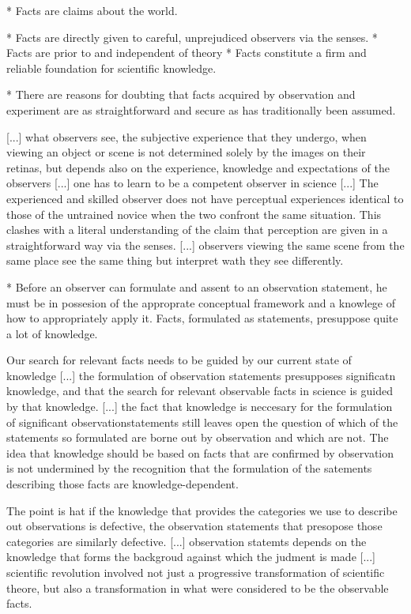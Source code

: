 * Facts are claims about the world.

* Facts are directly given to careful, unprejudiced observers via the senses.
* Facts are prior to and independent of theory
* Facts constitute a firm and reliable foundation for scientific knowledge.

* There are reasons for doubting that facts acquired by observation and experiment are as straightforward and secure as has traditionally been assumed.

{\color{red} [...] what observers see, the subjective experience that they undergo, when viewing an object or scene is not determined solely by the images on their retinas, but depends also on the experience, knowledge and expectations of the observers [...] one has to learn to be a competent observer in science [...] The experienced and skilled observer does not have perceptual experiences identical to those of the untrained novice when the two confront the same situation. This clashes with a literal understanding of the claim that perception are given in a straightforward way via the senses. [...] observers viewing the same scene from the same place see the same thing but interpret wath they see differently. }

* Before an observer can formulate and assent to an observation statement, he must be in possesion of the approprate conceptual framework and a knowlege of how to appropriately apply it. Facts, formulated as statements, presuppose quite a lot of knowledge.

{\color{red} Our search for relevant facts needs to be guided by our current state of knowledge [...] the formulation of observation statements presupposes significatn knowledge, and that the search for relevant observable facts in science is guided by that knowledge. [...] the fact that knowledge is neccesary for the formulation of significant observationstatements still leaves open the question of which of the statements so formulated are borne out by observation and which are not. The idea that knowledge should be based on facts that are confirmed by observation is not undermined by the recognition that the formulation of the satements describing those facts are knowledge-dependent.}

{\color{red} The point is hat if the knowledge that provides the categories we use to describe out observations is defective, the observation statements that presopose those categories are similarly defective. [...] observation statemts depends on the knowledge that forms the backgroud against which the judment is made [...] scientific revolution involved not just a progressive transformation of scientific theore, but also a transformation in what were considered to be the observable facts. }

